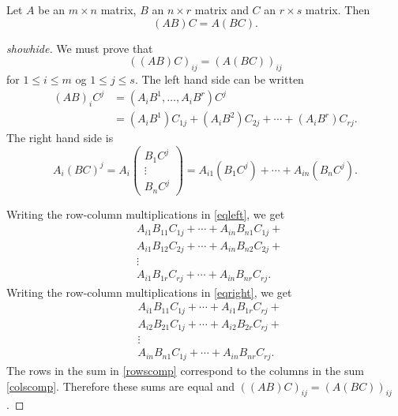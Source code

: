 \documentclass{article}
\begin{document}
\begin{theorem}\label{thmmatmultass}
Let $A$ be an $m\times n$ matrix, $B$ an $n\times r$ matrix and $C$ an $r\times s$ matrix. Then
$$
(A B) C = A (B C).
$$
\end{theorem}
\begin{proof}[showhide]
  We must prove that 
$$
((A B) C)_{ij} = (A (B C))_{ij}
$$
for $1\leq i \leq m$ og $1\leq j \leq s$. The left hand side can be written
\begin{align}\label{eqleft}
(A B)_i C^j &= (A_i B^1, \dots, A_i B^r) C^j\\
            &= (A_i B^1) C_{1j} + (A_i B^2) C_{2j} + \cdots + (A_i B^r) C_{rj}.
\end{align}
The right hand side is 
\begin{equation}\label{eqright}
A_i (B C)^j = A_i \begin{pmatrix} B_1 C^j \\ \vdots \\ B_n C^j\end{pmatrix}
            = A_{i1} (B_1 C^j) + \cdots + A_{in} (B_n C^j).
          \end{equation}

          Writing the row-column multiplications in \eqref{eqleft}, we get
\begin{align}\label{rowscomp}
&A_{i1} B_{11} C_{1j} + \cdots + A_{in} B_{n1} C_{1j} +\\
&A_{i1} B_{12} C_{2j} + \cdots + A_{in} B_{n2} C_{2j} +\\
&\vdots\\
&A_{i1} B_{1r} C_{rj} + \cdots + A_{in} B_{nr} C_{rj}.
\end{align}
          Writing the row-column multiplications in \eqref{eqright}, we get
\begin{align}\label{colscomp}
&A_{i1} B_{11} C_{1j} + \cdots + A_{i1} B_{1r} C_{rj} +\\
&A_{i2} B_{21} C_{1j} + \cdots + A_{i2} B_{2r} C_{rj} +\\
&\vdots\\
&A_{in} B_{n1} C_{1j} + \cdots + A_{in} B_{nr} C_{rj}.
\end{align}
The rows in the sum in  \eqref{rowscomp} correspond to the columns in the sum \eqref{colscomp}.
Therefore these sums are equal and $((A B) C)_{ij} = (A (B C))_{ij}$.
\end{proof}
\end{document}
